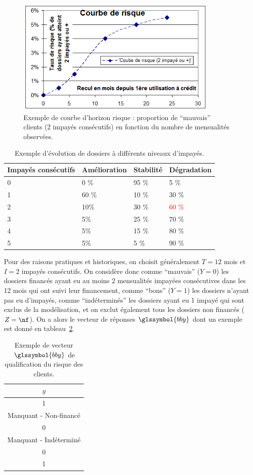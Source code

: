 \begin{figure}
\centering
\includegraphics[width=10cm]{figures/chapitre1/courbe_risque.png}
\caption{\label{fig:courbe_horizon} Exemple de courbe d'horizon risque : proportion de ``mauvais'' clients (2 impayés consécutifs) en fonction du nombre de mensualités observées.}
\end{figure}

\begin{table}
\centering
\caption{\label{tab:impayes} Exemple d'évolution de dossiers à différents niveaux d'impayés.} 
\begin{tabular}{l|l|l|l}
Impayés consécutifs & Amélioration & Stabilité & Dégradation \\
\hline
0 & 0 \% & 95 \% & 5 \%  \\
1 & 60 \% & 10 \% & 30 \%  \\
2 & 10\% & 30 \% & \textcolor{red}{60 \%} \\
3 & 5\% & 25 \% & {70 \%} \\
4 & 5\% & 15 \% & {80 \%} \\
5 & 5\% & 5 \% & {90 \%} \\
\end{tabular}
\end{table}

Pour des raisons pratiques et historiques, on choisit généralement $T=12$ mois et $I = 2$ impayés consécutifs. On considère donc comme ``mauvais'' ($Y=0$) les dossiers financés ayant eu au moins 2 mensualités impayées consécutives dans les 12 mois qui ont suivi leur financement, comme ``bons'' ($Y=1$) les dossiers n'ayant pas eu d'impayés, comme ``indéterminés'' les dossiers ayant eu 1 impayé qui sont exclus de la modélisation, et on exclut également tous les dossiers non financés ($Z=\nf$). On a alors le vecteur de réponses $\glssymbol{bby}$ dont un exemple est donné en tableau~\ref{tab:rep_ex}.

\begin{table}
\centering
\caption{\label{tab:rep_ex} Exemple de vecteur $\glssymbol{bby}$ de qualification du risque des clients.}
\begin{tabular}{|c|}
\hline
$y$ \\
\hline
1 \\
Manquant - Non-financé \\
0 \\
Manquant - Indéterminé \\
0 \\
1 \\
\hline
\end{tabular}
\end{table}

